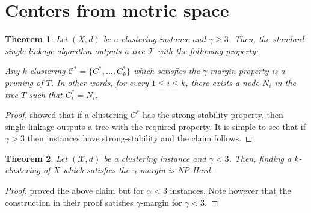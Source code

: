 \documentclass[letterpaper,12pt,titlepage,oneside,final]{book}
\newtheorem{theorem}{Theorem}
\newcommand{\mc}{\mathcal}
\begin{document}
\section{Centers from metric space}
\begin{theorem}
\label{thm:upperCenterMetric}
Let $(X , d)$ be a clustering instance and $\gamma \ge 3$. Then, the standard single-linkage algorithm outputs a tree $\mc T$ with the following property:


Any $k$-clustering $\mc C^* = \{C_1^*, \ldots, C_k^* \}$ which satisfies the $\gamma$-margin property is a pruning of $T$. In other words, for every $1 \le i \le k$, there exists a node $N_i$ in the tree $T$ such that $C_i^* = N_i$. 
\end{theorem}

\begin{proof}
\cite{balcan2008discriminative} showed that if a clustering $C^*$ has the strong stability property, then single-linkage outputs a tree with the required property. It is simple to see that if $\gamma > 3$ then instances have strong-stability and the claim follows.  
\end{proof}


\begin{theorem}
\label{thm:lowerCenterMetric}
Let $(\mc X, d)$ be a clustering instance and $\gamma < 3$. Then, finding a $k$-clustering of $X$ which satisfies the $\gamma$-margin is NP-Hard.
\end{theorem}
\begin{proof}
\cite{awasthi2012center} proved the above claim but for $\alpha < 3$ instances. Note however that the construction in their proof satisfies $\gamma$-margin for $\gamma < 3$. 
\end{proof}



\end{document}
